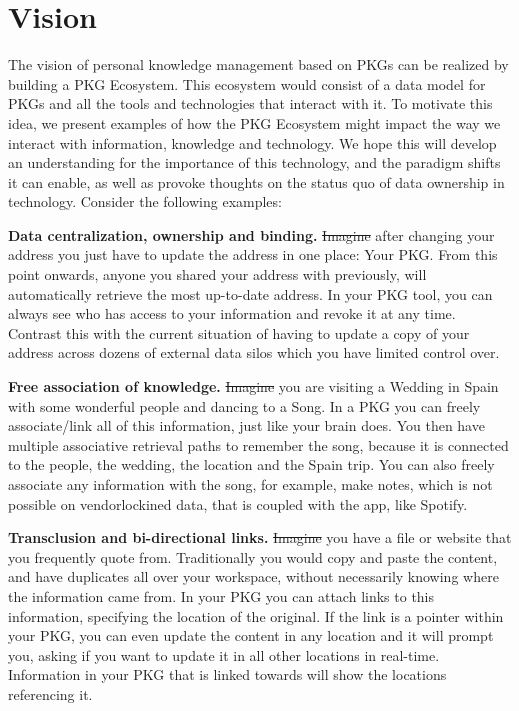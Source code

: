 \section{Vision}
The vision of personal knowledge management based on PKGs can be realized by building a PKG Ecosystem. This ecosystem would consist of a data model for PKGs and all the tools and technologies that interact with it. To motivate this idea, we present examples of how the PKG Ecosystem might impact the way we interact with information, knowledge and technology. We hope this will develop an understanding for the importance of this technology, and the paradigm shifts it can enable, as well as provoke thoughts on the status quo of data ownership in technology. Consider the following examples:

\textbf{Data centralization, ownership and binding.} \sout{Imagine} after changing your address you just have to update the address in one place: Your PKG. From this point onwards, anyone you shared your address with previously, will automatically retrieve the most up-to-date address. In your PKG tool, you can always see who has access to your information and revoke it at any time. Contrast this with the current situation of having to update a copy of your address across dozens of external data silos which you have limited control over.

\textbf{Free association of knowledge.} \sout{Imagine} you are visiting a Wedding in Spain with some wonderful people and dancing to a Song. In a PKG you can freely associate/link all of this information, just like your brain does. You then have multiple associative retrieval paths to remember the song, because it is connected to the people, the wedding, the location and the Spain trip. You can also freely associate any information with the song, for example, make notes, which is not possible on \gls{vendorlockin}ed data, that is coupled with the app, like Spotify.

\textbf{Transclusion and bi-directional links.} \sout{Imagine} you have a file or website that you frequently quote from. Traditionally you would copy and paste the content, and have duplicates all over your workspace, without necessarily knowing where the information came from. In your PKG you can attach links to this information, specifying the location of the original. If the link is a pointer within your PKG, you can even update the content in any location and it will prompt you, asking if you want to update it in all other locations in real-time. Information in your PKG that is linked towards will show the locations referencing it.





